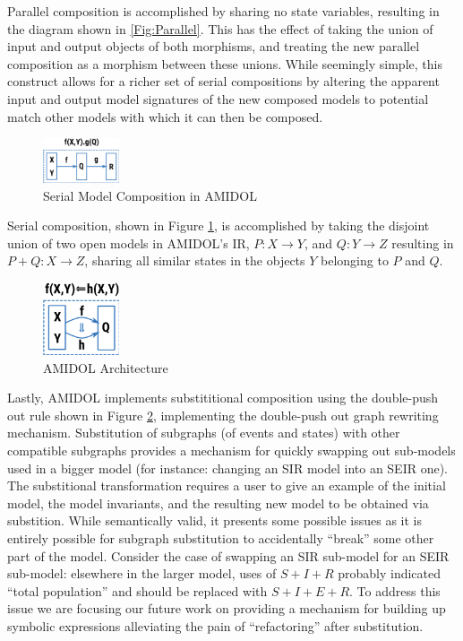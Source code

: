 \documentclass[12pt]{galois-whitepaper}
\begin{document}
Parallel composition is accomplished by sharing no state variables,
resulting in the diagram shown in \ref{Fig:Parallel}.  This has the
effect of taking the union of input and output objects of both
morphisms, and treating the new parallel composition as a morphism
between these unions.  While seemingly simple, this construct allows
for a richer set of serial compositions by altering the apparent input
and output model signatures of the new composed models to potential
match other models with which it can then be composed.

\begin{figure}
  \centering
  \includegraphics[width=0.2\textwidth]{figs/serial.png}
  \caption{Serial Model Composition in AMIDOL}
  \label{Fig:Serial}
\end{figure}

Serial composition, shown in Figure \ref{Fig:Serial}, is accomplished by taking the disjoint
union of two open models in AMIDOL's IR, $P: X \rightarrow Y$, and
$Q: Y \rightarrow Z$ resulting in $P+Q: X \rightarrow Z$, sharing all
similar states in the objects $Y$ belonging to $P$ and $Q$.

\begin{figure}
  \centering
  \includegraphics[width=0.2\textwidth]{figs/substitution.png}
  \caption{AMIDOL Architecture}
  \label{Fig:Sub}
\end{figure}

Lastly, AMIDOL implements substititional composition using the
double-push out rule shown in Figure \ref{Fig:Sub}, implementing the
double-push out graph rewriting mechanism.  Substitution of subgraphs
(of events and states) with other compatible subgraphs
provides a mechanism for quickly swapping out sub-models used in a
bigger model (for instance: changing an SIR model into an SEIR one).
The substitional transformation requires a user to give an example of
the initial model, the model invariants, and the resulting new model
to be obtained via substition.  While semantically valid, it presents
some possible issues as it is entirely possible for subgraph
substitution to accidentally “break” some other part of the
model. Consider the case of swapping an SIR sub-model for an SEIR
sub-model: elsewhere in the larger model, uses of $S + I + R$ probably
indicated “total population” and should be replaced with $S + I + E +
R$.  To address this issue we are focusing our future work on
providing a mechanism for building up symbolic expressions
alleviating the pain of “refactoring” after
substitution.
\end{document}

